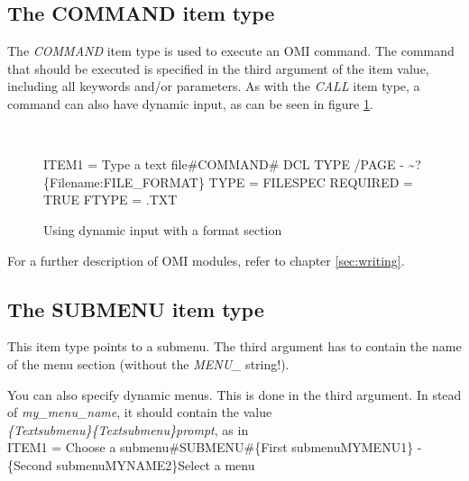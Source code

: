 \documentclass[a4paper]{book}
\newcommand{\vs}{\vspace{3mm}}
\renewcommand{\indent}{\hspace*{5mm}}
\begin{document}
\subsection{The COMMAND item type}
\label{subsubsec:mylabel35}

The \textsl{COMMAND} item type is used to 
execute an OMI command. The command that should be executed is specified in 
the third argument of the item value, including all keywords and/or 
parameters. As with the \textsl{CALL} item type, a 
command can also have dynamic input, as can be seen in
figure \ref{fig:dyninputformat}.

\begin{figure}[ht]
\begin{minipage}[t]{\textwidth}
\hrulefill \\
\begin{ttfamily}
\indent ITEM1 = Type a text file{\#}COMMAND{\#} DCL TYPE /PAGE - \newline
\indent\indent\~{}?{\{}Filename:\textbar FILE{\_}FORMAT{\}} \newline
 \newline
{} \newline
\indent TYPE = FILESPEC \newline
\indent REQUIRED = TRUE \newline
\indent FTYPE = .TXT
\end{ttfamily}
\caption{Using dynamic input with a format section}\label{fig:dyninputformat}
\hrulefill
\end{minipage}
\end{figure}

For a further description of OMI modules, refer to chapter \ref{sec:writing}.

\subsection{The SUBMENU item type}
\label{subsubsec:mylabel36}

This item type points to a submenu. The third argument has to contain the 
name of the menu section (without the \textsl{MENU{\_}} string!).

\vs

You can also specify dynamic menus. This is done in the third argument. In 
stead of \textit{my{\_}menu{\_}name}, it should contain the value \\
\textsl{{\{}\textit{Text}\textbar\textit{submenu}{\}}{\{}\textit{Text}\textbar\textit{submenu}{\}}\textit{prompt}},
as in\\
\indent\textsf{ITEM1 = Choose a submenu{\#}SUBMENU{\#}{\{}First submenu\textbar MYMENU1{\}} - }\\
\indent\indent\textsf{{\{}Second submenu\textbar MYNAME2{\}}Select a menu}
\end{document}
